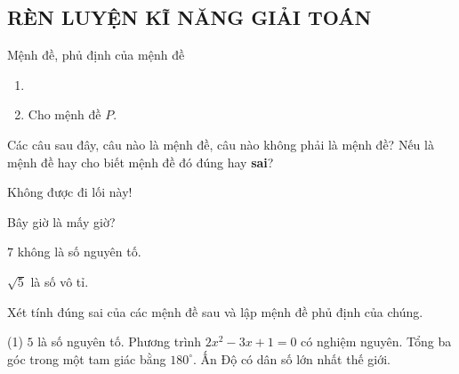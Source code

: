 	
\subsection{RÈN LUYỆN KĨ NĂNG GIẢI TOÁN}
\begin{dang}{Mệnh đề, phủ định của mệnh đề}
	\begin{enumerate}[\iconMT]
		\item {}
		\item {} Cho mệnh đề $P$. 
	\end{enumerate}	
\end{dang}

\begin{vd}
	Các câu sau đây, câu nào là mệnh đề, câu nào không phải là mệnh đề? Nếu là mệnh đề hay cho biết mệnh đề đó đúng hay \textbf{sai}?
	\begin{listEX}[2]
		\item Không được đi lối này!
		\item Bây giờ là mấy giờ?
		\item $7$ không là số nguyên tố.
		\item $\sqrt{5}$ là số vô tỉ.
	\end{listEX}
\end{vd}

\begin{vd}
	Xét tính đúng sai của các mệnh đề sau và lập mệnh đề phủ định của chúng.\begin{tasks}(1)
		\task $5$ là số nguyên tố.
		\task Phương trình $2x^2-3x+1=0$ có nghiệm nguyên.
		\task Tổng ba góc trong một tam giác bằng $180^\circ$.
		\task Ấn Độ có dân số lớn nhất thế giới.
	\end{tasks}
\end{vd}

